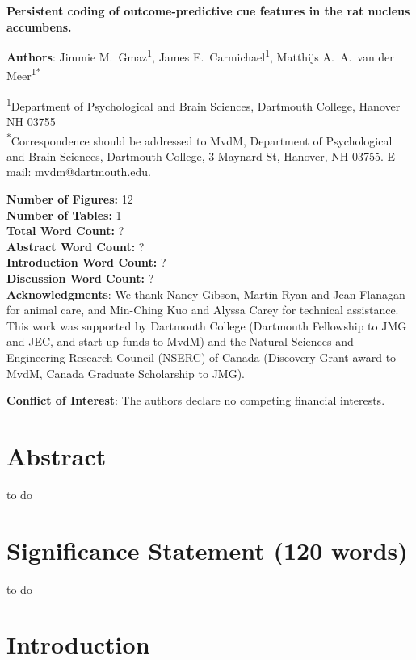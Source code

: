 \documentclass[11pt]{article}
\begin{document}
{\Large\bf Persistent coding of outcome-predictive cue features in the
  rat nucleus accumbens.}

{\bf Authors}: Jimmie M.\ Gmaz\textsuperscript{1}, James
E.\ Carmichael\textsuperscript{1}, Matthijs A.\ A.\ van der
Meer\textsuperscript{1*}

\textsuperscript{1}Department of Psychological and Brain Sciences,
Dartmouth College, Hanover NH
03755\\ 

\textsuperscript{*}Correspondence should be addressed to MvdM,
Department of Psychological and Brain Sciences, Dartmouth College, 3
Maynard St, Hanover, NH 03755. E-mail: {\sffamily mvdm@dartmouth.edu}.

\textbf{Number of Figures:} 12\\
\textbf{Number of Tables:} 1\\
\textbf{Total Word Count:} ?\\
\textbf{Abstract Word Count:} ?\\
\textbf{Introduction Word Count:} ?\\
\textbf{Discussion Word Count:} ?\\

\textbf{Acknowledgments}: We thank Nancy Gibson, Martin Ryan and Jean
Flanagan for animal care, and Min-Ching Kuo and
Alyssa Carey for technical assistance. This work was supported by
Dartmouth College (Dartmouth Fellowship to JMG and JEC, and start-up funds to
MvdM) and the Natural Sciences and Engineering Research Council
(NSERC) of Canada (Discovery Grant award to MvdM, Canada Graduate
Scholarship to JMG).

\textbf{Conflict of Interest}: The authors declare no competing
financial interests.\\

\newpage
\linenumbers

\section*{Abstract}

to do

\section*{Significance Statement (120 words)}

to do

\newpage

\section*{Introduction}
\end{document}
